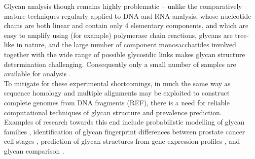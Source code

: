 \documentclass[12pt,a4paper]{article}
\begin{document}
Glycan analysis though remains highly problematic -- unlike the comparatively mature techniques regularly applied to DNA and RNA analysis, whose nucleotide chains are both linear and contain only 4 elementary components, and which are easy to amplify using (for example) polymerase chain reactions, glycans are tree-like in nature, and the large number of component monosaccharides involved together with the wide range of possible glycosidic links makes glycan structure determination challenging. Consequently only a small number of samples are available for analysis \citep{doi:10.1093/bioinformatics/bti666}.\\

To mitigate for these experimental shortcomings, in much the same way as sequence homology and multiple alignments may be exploited to construct complete genomes from DNA fragments (REF), there is a need for reliable computational techniques of glycan structure and prevalence prediction. Examples of research towards this end include probabilistic modelling of glycan families \citep{ueda2005probabilistic}, identification of glycan fingerprint differences between prostate cancer cell stages \citep{10.1371/journal.pcbi.1002813}, prediction of glycan structures from gene expression profiles \citep{doi:10.1093/bioinformatics/bti666}, and glycan comparison \citep{aoki2004score, aoki2004kcam}.
\end{document}
